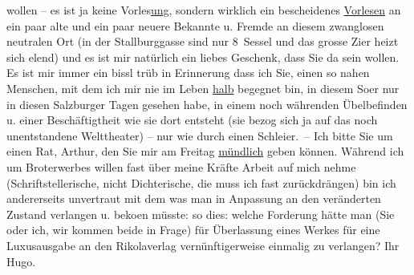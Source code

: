 \begin{ledgroupsized}[t]{13cm}
               wollen – es ist ja keine Vorles\uline{ung}, sondern wirklich
               ein bescheidenes \uline{Vorlesen} an ein paar alte und ein
               paar neuere Bekannte u. Fremde an diesem zwanglosen neutralen Ort (in der Stallburggasse sind nur 8 Sessel und das {\pb}grosse Zi{\geminationm}er heizt sich elend) und es ist mir natürlich ein
               liebes Geschenk, dass Sie da sein wollen.\pend
           \pstart
           Es ist mir immer ein bissl trüb in Erinnerung dass ich Sie, einen so nahen Menschen,
               mit dem ich mir nie im Leben \uline{halb} begegnet bin, in
               diesem So{\geminationm}er nur in diesen Salzburger Tagen gesehen habe, in einem noch {\pb}währenden Übelbefinden u. einer
               Beschäftigtheit wie sie dort entsteht (sie bezog sich ja auf das noch unentstandene
               Welttheater) – nur wie durch einen Schleier. –\pend
           \pstart
           Ich bitte Sie um einen Rat, Arthur, den Sie mir am Freitag{ }\uline{mündlich} geben können. Während ich um Broterwerbes
               willen {\pb}fast über meine Kräfte
               Arbeit auf mich nehme (Schriftstellerische, nicht Dichterische, die muss ich fast
               zurückdrängen) bin ich andererseits unvertraut mit dem was man in Anpassung an den
               veränderten Zustand verlangen u. beko{\geminationm}en müsste: so
               dies: welche Forderung hätte man (Sie oder ich, wir kommen beide in Frage) für
               Überlassung eines Werkes für eine Luxusausgabe an den Rikolaverlag vernünftigerweise einmalig zu verlangen?\pend
           \pstart
           \label{T_L02375_1v}\label{T_L02375_1h}\pend
           \pstart Ihr \spacefill\mbox{Hugo.}\pend{}          \endnumbering{}\end{ledgroupsized}  \newcommand{\dateiname}{L02375}\newcommand{\titel}{Hugo Hofmannsthal an Arthur Schnitzler, 28. 1. 192[2]}\newcommand{\editorInnen}{Martin Anton Müller und Gerd-Hermann Susen}
            \footnotesize
\begin{ledgroupsized}[t]{11.5cm}
\end{ledgroupsized}
         
      